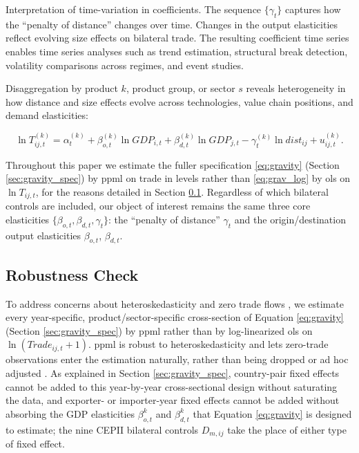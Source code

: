 \documentclass[preprint, 3p,
authoryear]{elsarticle} %
\begin{document}
Interpretation of time-variation in coefficients. The sequence
\(\{\gamma_t\}\) captures how the ``penalty of distance'' changes over
time. Changes in the output elasticities reflect evolving size effects
on bilateral trade. The resulting coefficient time series enables time
series analyses such as trend estimation, structural break detection,
volatility comparisons across regimes, and event studies.

Disaggregation by product \(k\), product group, or sector \(s\) reveals
heterogeneity in how distance and size effects evolve across
technologies, value chain positions, and demand elasticities:

\begin{equation}
\ln T_{ij,t}^{(k)} = \alpha_t^{(k)} + \beta_{o,t}^{(k)} \ln GDP_{i,t} + \beta_{d,t}^{(k)} \ln GDP_{j,t} - \gamma_t^{(k)} \ln dist_{ij} + u_{ij,t}^{(k)}.
\end{equation}

Throughout this paper we estimate the fuller specification
\eqref{eq:gravity} (Section \ref{sec:gravity_spec}) by \gls{ppml} on
trade in levels rather than \eqref{eq:grav_log} by \gls{ols} on
\(\ln T_{ij,t}\), for the reasons detailed in Section
\ref{sec:ppml_robust}. Regardless of which bilateral controls are
included, our object of interest remains the same three core
elasticities \(\{\beta_{o,t},\beta_{d,t},\gamma_{t}\}\): the ``penalty
of distance'' \(\gamma_t\) and the origin/destination output
elasticities \(\beta_{o,t}\), \(\beta_{d,t}\).

\subsection{Robustness Check}\label{sec:ppml_robust}

To address concerns about heteroskedasticity and zero trade flows
\citep{SantosSilvaTenreyro2006, santos2011}, we estimate every
year-specific, product/sector-specific cross-section of Equation
\eqref{eq:gravity} (Section \ref{sec:gravity_spec}) by \gls{ppml} rather
than by log-linearized \gls{ols} on \(\ln(Trade_{ij,t}+1)\). \gls{ppml}
is robust to heteroskedasticity and lets zero-trade observations enter
the estimation naturally, rather than being dropped or ad hoc adjusted
\citep{SantosSilvaTenreyro2006}. As explained in Section
\ref{sec:gravity_spec}, country-pair fixed effects cannot be added to
this year-by-year cross-sectional design without saturating the data,
and exporter- or importer-year fixed effects cannot be added without
absorbing the GDP elasticities \(\beta_{o,t}^{k}\) and
\(\beta_{d,t}^{k}\) that Equation \eqref{eq:gravity} is designed to
estimate; the nine CEPII bilateral controls \(D_{m,ij}\)
\citep{conte2022cepii} take the place of either type of fixed effect.
\end{document}

